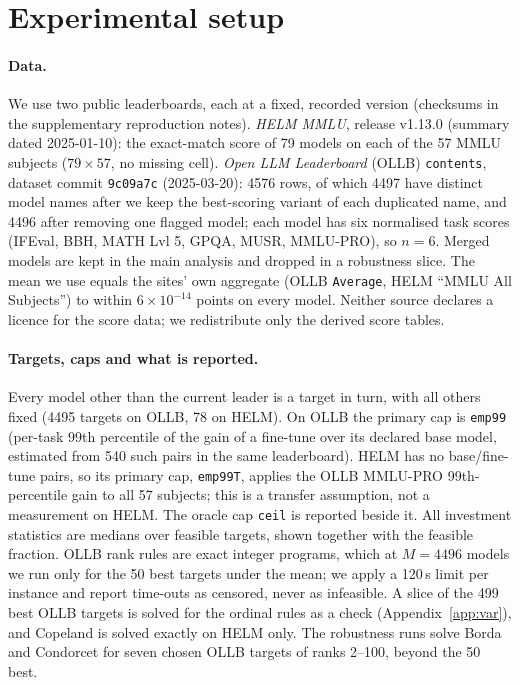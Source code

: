 \documentclass{article}
\begin{document}
\section{Experimental setup}
\label{sec:exp}
\paragraph{Data.}
We use two public leaderboards, each at a fixed, recorded version (checksums in the supplementary reproduction notes). \emph{HELM MMLU}, release v1.13.0 (summary dated 2025-01-10): the exact-match score of 79 models on each of the 57 MMLU subjects ($79\times57$, no missing cell). \emph{Open LLM Leaderboard} (OLLB) \texttt{contents}, dataset commit \texttt{9c09a7c} (2025-03-20): 4576 rows, of which 4497 have distinct model names after we keep the best-scoring variant of each duplicated name, and 4496 after removing one flagged model; each model has six normalised task scores (IFEval, BBH, MATH Lvl 5, GPQA, MUSR, MMLU-PRO), so $n=6$. Merged models are kept in the main analysis and dropped in a robustness slice. The mean we use equals the sites' own aggregate (OLLB \texttt{Average}, HELM ``MMLU All Subjects'') to within $6\times10^{-14}$ points on every model. Neither source declares a licence for the score data; we redistribute only the derived score tables.

\paragraph{Targets, caps and what is reported.}
Every model other than the current leader is a target in turn, with all others fixed (4495 targets on OLLB, 78 on HELM). On OLLB the primary cap is \texttt{emp99} (per-task 99th percentile of the gain of a fine-tune over its declared base model, estimated from 540 such pairs in the same leaderboard). HELM has no base/fine-tune pairs, so its primary cap, \texttt{emp99T}, applies the OLLB MMLU-PRO 99th-percentile gain to all 57 subjects; this is a transfer assumption, not a measurement on HELM. The oracle cap \texttt{ceil} is reported beside it. All investment statistics are medians over feasible targets, shown together with the feasible fraction. OLLB rank rules are exact integer programs, which at $M=4496$ models we run only for the 50 best targets under the mean; we apply a 120\,s limit per instance and report time-outs as censored, never as infeasible. A slice of the 499 best OLLB targets is solved for the ordinal rules as a check (Appendix~\ref{app:var}), and Copeland is solved exactly on HELM only. The robustness runs solve Borda and Condorcet for seven chosen OLLB targets of ranks 2--100, beyond the 50 best.
\end{document}

